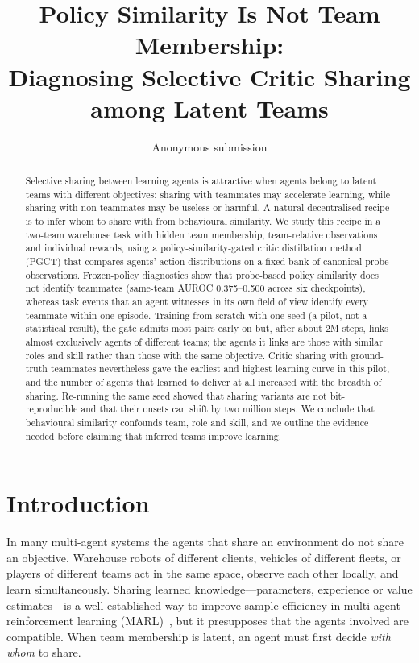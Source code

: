 \documentclass{article}
\title{Policy Similarity Is Not Team Membership:\\ Diagnosing Selective Critic Sharing among Latent Teams}
\author{Anonymous submission}
\begin{document}
\maketitle

\begin{abstract}
Selective sharing between learning agents is attractive when agents belong to latent teams with different
objectives: sharing with teammates may accelerate learning, while sharing with non-teammates may be useless
or harmful. A natural decentralised recipe is to infer whom to share with from behavioural similarity.
We study this recipe in a two-team warehouse task with hidden team membership, team-relative observations and
individual rewards, using a policy-similarity-gated critic distillation method (PGCT) that compares agents'
action distributions on a fixed bank of canonical probe observations. Frozen-policy diagnostics show that
probe-based policy similarity does not identify teammates (same-team AUROC 0.375--0.500 across six
checkpoints), whereas task events that an agent witnesses in its own field of view identify every teammate
within one episode. Training from scratch with one seed (a pilot, not a statistical result), the gate admits
most pairs early on but, after about 2M steps, links almost exclusively agents of different teams; the agents
it links are those with similar roles and skill rather than those with the same objective. Critic sharing
with ground-truth teammates nevertheless gave the earliest and highest learning curve in this pilot, and
the number of agents that learned to deliver at all increased with the breadth of sharing. Re-running
the same seed showed that sharing variants are not bit-reproducible and that their onsets can shift by
two million steps. We conclude that behavioural similarity confounds team, role and skill, and we outline
the evidence needed before claiming that inferred teams improve learning.
\end{abstract}

\section{Introduction}
In many multi-agent systems the agents that share an environment do not share an objective. Warehouse robots
of different clients, vehicles of different fleets, or players of different teams act in the same space, observe
each other locally, and learn simultaneously. Sharing learned knowledge---parameters, experience or value
estimates---is a well-established way to improve sample efficiency in multi-agent reinforcement learning
(MARL)~\cite{christianos2020seac,christianos2021seps}, but it presupposes that the agents involved are compatible.
When team membership is latent, an agent must first decide \emph{with whom} to share.
\end{document}
